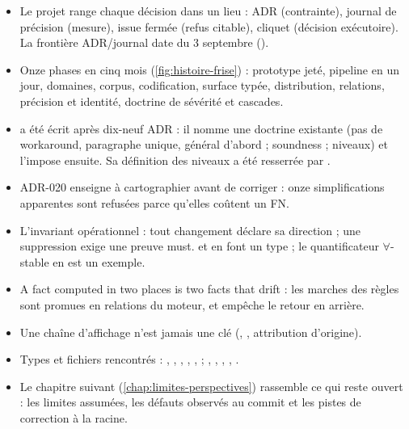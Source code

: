 \begin{resume}
\begin{itemize}
  \item Le projet range chaque décision dans un lieu : ADR (contrainte), journal de précision (mesure), issue fermée  (refus citable), cliquet (décision exécutoire). La frontière ADR/journal date du 3 septembre ().
  \item Onze phases en cinq mois (\cref{fig:histoire-frise}) : prototype jeté, pipeline en un jour, domaines, corpus, codification, surface typée, distribution, relations, précision et identité, doctrine de sévérité et cascades.
  \item {} a été écrit après dix-neuf ADR : il nomme une doctrine existante (pas de workaround, paragraphe unique, général d'abord ; soundness ; niveaux) et l'impose ensuite. Sa définition des niveaux a été resserrée par .
  \item ADR-020 enseigne à cartographier avant de corriger : onze simplifications apparentes sont refusées parce qu'elles coûtent un FN.
  \item L'invariant opérationnel : tout changement déclare sa direction ; une suppression exige une preuve must.  et  en font un type ; le quantificateur $\forall$-stable en est un exemple.
  \item \og A fact computed in two places is two facts that drift\fg{} : les marches des règles sont promues en relations du moteur, et  empêche le retour en arrière.
  \item Une chaîne d'affichage n'est jamais une clé (, , attribution d'origine).
  \item Types et fichiers rencontrés : , , , , ,  ; , , , , .
  \item Le chapitre suivant (\cref{chap:limites-perspectives}) rassemble ce qui reste ouvert : les limites assumées, les défauts observés au commit  et les pistes de correction à la racine.
\end{itemize}
\end{resume}


